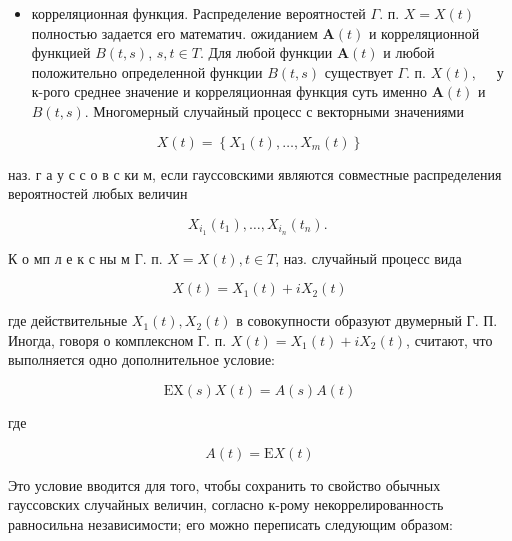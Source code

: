 \documentclass[10pt]{article}
\begin{document}
\begin{itemize}

  \item корреляционная функция. Распределение вероятностей $\Gamma$. п. $X=X(t)$ полностью задается его математич. ожиданием $\boldsymbol{A}(t)$ и корреляционной функцией $B(t, s)$, $s, t \in T$. Для любой функции $\boldsymbol{A}(t)$ и любой положительно определенной функции $B(t, s)$ существует $\Gamma$. п. $X(t), \quad$ у к-рого среднее значение и корреляционная функция суть именно $\boldsymbol{A}(t)$ и $B(t, s)$. Многомерный случайный процесс с векторными значениями

\end{itemize}



\[

X(t)=\left\{X_{1}(t), \ldots, X_{m}(t)\right\}

\]



наз. г а у с с о в с ки м, если гауссовскими являются совместные распределения вероятностей любых величин



\[

X_{i_{1}}\left(t_{1}\right), \ldots, X_{i_{n}}\left(t_{n}\right) \text {. }

\]



К о мп л е к с ны м $Г$. п. $X=X(t), t \in T$, наз. случайный процесс вида



\[

X(t)=X_{1}(t)+i X_{2}(t)

\]



где действительные $X_{1}(t), X_{2}(t)$ в совокупности образуют двумерный Г. П. Иногда, говоря о комплексном Г. п. $X(t)=X_{1}(t)+i X_{2}(t)$, считают, что выполняется одно дополнительное условие:



\[

\mathrm{EX}(s) X(t)=A(s) A(t)

\]



где



\[

A(t)=\mathrm{E} X(t)

\]



Это условие вводится для того, чтобы сохранить то свойство обычных гауссовских случайных величин, согласно к-рому некоррелированность равносильна независимости; его можно переписать следующим образом:
\end{document}

